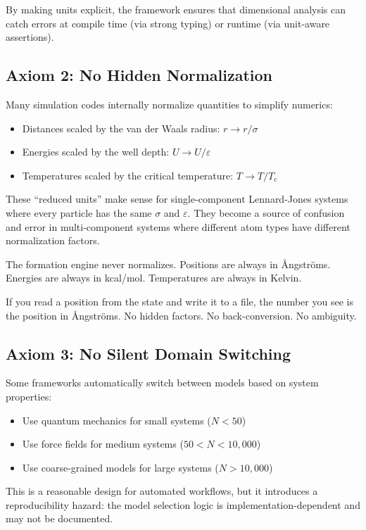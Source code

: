 \documentclass[11pt]{article}
\begin{document}
By making units explicit, the framework ensures that dimensional analysis can catch errors at compile time (via strong typing) or runtime (via unit-aware assertions).

\subsection{Axiom 2: No Hidden Normalization}

Many simulation codes internally normalize quantities to simplify numerics:
\begin{itemize}
\item Distances scaled by the van der Waals radius: $r \to r/\sigma$
\item Energies scaled by the well depth: $U \to U/\varepsilon$  
\item Temperatures scaled by the critical temperature: $T \to T/T_c$
\end{itemize}

These ``reduced units'' make sense for single-component Lennard-Jones systems where every particle has the same $\sigma$ and $\varepsilon$. They become a source of confusion and error in multi-component systems where different atom types have different normalization factors.

The formation engine never normalizes. Positions are always in Ångströms. Energies are always in kcal/mol. Temperatures are always in Kelvin.

If you read a position from the state and write it to a file, the number you see is the position in Ångströms. No hidden factors. No back-conversion. No ambiguity.

\subsection{Axiom 3: No Silent Domain Switching}

Some frameworks automatically switch between models based on system properties:
\begin{itemize}
\item Use quantum mechanics for small systems ($N < 50$)
\item Use force fields for medium systems ($50 < N < 10{,}000$)
\item Use coarse-grained models for large systems ($N > 10{,}000$)
\end{itemize}

This is a reasonable design for automated workflows, but it introduces a reproducibility hazard: the model selection logic is implementation-dependent and may not be documented.
\end{document}
